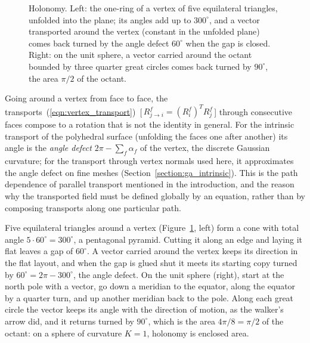 \begin{figure}[t]
\centering
\begin{minipage}[b]{0.52\textwidth}\centering{}\end{minipage}\hfill
\begin{minipage}[b]{0.42\textwidth}\centering{}\end{minipage}
\caption{Holonomy. Left: the one-ring of a vertex of five equilateral triangles, unfolded into the plane; its angles add up to $300^\circ$, and a vector transported around the vertex (constant in the unfolded plane) comes back turned by the angle defect $60^\circ$ when the gap is closed. Right: on the unit sphere, a vector carried around the octant bounded by three quarter great circles comes back turned by $90^\circ$, the area $\pi/2$ of the octant.}
\label{fig:holonomy}
\end{figure}

\begin{rem}[Curvature]
Going around a vertex from face to face, the transports~(\ref{eqn:vertex_transport})~[\,$R^f_{j\to i} = (R_i^f)^T R_j^f$\,] through consecutive faces compose to a rotation that is not the identity in general. For the intrinsic transport of the polyhedral surface (unfolding the faces one after another) its angle is the \emph{angle defect} $2\pi - \sum_f \alpha_f$ of the vertex, the discrete Gaussian curvature; for the transport through vertex normals used here, it approximates the angle defect on fine meshes (Section~\ref{section:ga_intrinsic}). This is the path dependence of parallel transport mentioned in the introduction, and the reason why the transported field must be defined globally by an equation, rather than by composing transports along one particular path.
\end{rem}

\begin{example}
\label{ex:holonomy}
Five equilateral triangles around a vertex (Figure~\ref{fig:holonomy}, left) form a cone with total angle $5 \cdot 60^\circ = 300^\circ$, a pentagonal pyramid. Cutting it along an edge and laying it flat leaves a gap of $60^\circ$. A vector carried around the vertex keeps its direction in the flat layout, and when the gap is glued shut it meets its starting copy turned by $60^\circ = 2\pi - 300^\circ$, the angle defect. On the unit sphere (right), start at the north pole with a vector, go down a meridian to the equator, along the equator by a quarter turn, and up another meridian back to the pole. Along each great circle the vector keeps its angle with the direction of motion, as the walker's arrow did, and it returns turned by $90^\circ$, which is the area $4\pi/8 = \pi/2$ of the octant: on a sphere of curvature $K = 1$, holonomy is enclosed area.
\end{example}

